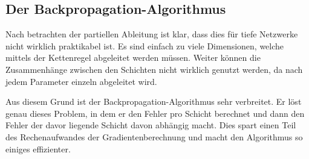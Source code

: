 \subsection{Der Backpropagation-Algorithmus}

%
%
%
%
Nach betrachten der partiellen Ableitung ist klar, dass dies für tiefe Netzwerke nicht wirklich praktikabel ist. Es sind einfach zu viele Dimensionen, welche mittels der Kettenregel abgeleitet werden müssen. Weiter können die Zusammenhänge zwischen den Schichten nicht wirklich genutzt werden, da nach jedem Parameter einzeln abgeleitet wird.

Aus diesem Grund ist der Backpropagation-Algorithmus sehr verbreitet. Er löst genau dieses Problem, in dem er den Fehler pro Schicht berechnet und dann den Fehler der davor liegende Schicht davon abhängig macht. Dies spart einen Teil des Rechenaufwandes der Gradientenberechnung und macht den Algorithmus so einiges effizienter.

